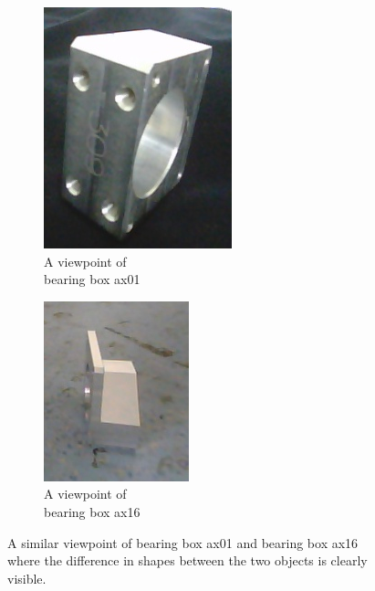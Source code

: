 \begin{itemize}
\begin{figure}
	\centering
	\begin{subfigure}{.3\textwidth}
  		\centering
  		\includegraphics[width=.5\linewidth]{images/ax01_diff}
  		\caption{A viewpoint of \\bearing box ax01}
  		\label{Fig:sim1a}
	\end{subfigure}%
	\begin{subfigure}{.3\textwidth}
  		\centering
  		\includegraphics[width=.5\linewidth]{images/ax16_diff}
  		\caption{A viewpoint of \\bearing box ax16}
  		\label{Fig:sim1b}
	\end{subfigure}%
	\caption{A similar viewpoint of bearing box ax01 and bearing box ax16 where the difference in shapes between the two objects is clearly visible.}
	\label{Fig:sim1}
\end{figure}


\end{itemize}
